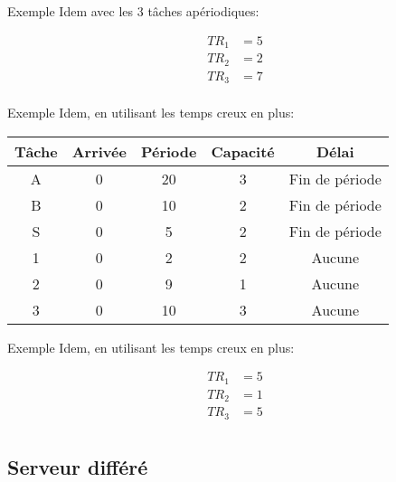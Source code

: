 \begin{frame}{Exemple}
  Idem avec les 3 tâches apériodiques:
  \begin{center}
    
    \begin{align*}
      TR_1 &= 5\\
      TR_2 &= 2\\
      TR_3 &= 7\\
    \end{align*}
  \end{center}
\end{frame} 

\begin{frame}{Exemple}
  Idem, en utilisant les temps creux en plus:
  \begin{center}
    \begin{tabular}{ccccc}
      \hline
      Tâche & Arrivée & Période & Capacité & Délai \\
      \hline
      A & 0 & 20 & 3 & Fin de période\\
      B & 0 & 10 & 2 & Fin de période\\
      S & 0 &  5 & 2 & Fin de période\\
      1 & 0 &  2 & 2 & Aucune\\
      2 & 0 &  9 & 1 & Aucune\\
      3 & 0 & 10 & 3 & Aucune\\
      \hline
    \end{tabular}
    \pause
    
  \end{center}
\end{frame} 

\begin{frame}{Exemple}
  Idem, en utilisant les temps creux en plus:
  \begin{center}
    
    \begin{align*}
      TR_1 &= 5\\
      TR_2 &= 1\\
      TR_3 &= 5\\
    \end{align*}
  \end{center}
\end{frame} 

\subsection{Serveur différé}


